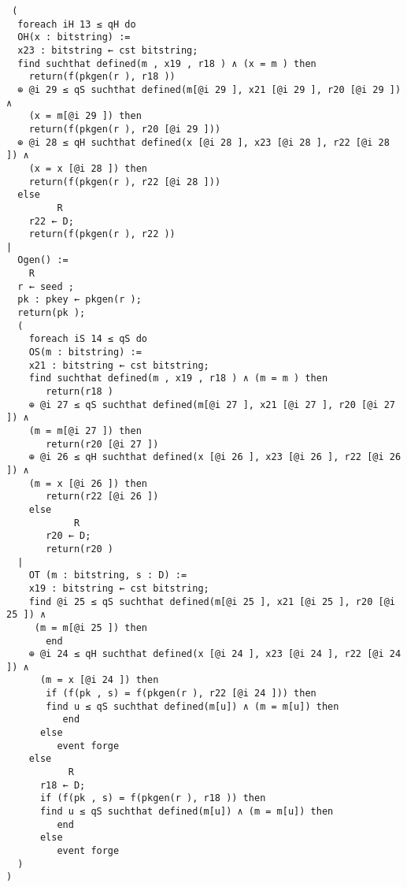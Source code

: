 \documentclass[a4paper,openright,twoside,12pt]{report}
\begin{document}
\begin{verbatim}
 (
  foreach iH 13 ≤ qH do
  OH(x : bitstring) :=
  x23 : bitstring ← cst bitstring;
  find suchthat defined(m , x19 , r18 ) ∧ (x = m ) then
    return(f(pkgen(r ), r18 ))
  ⊕ @i 29 ≤ qS suchthat defined(m[@i 29 ], x21 [@i 29 ], r20 [@i 29 ]) ∧ 
    (x = m[@i 29 ]) then
	return(f(pkgen(r ), r20 [@i 29 ]))
  ⊕ @i 28 ≤ qH suchthat defined(x [@i 28 ], x23 [@i 28 ], r22 [@i 28 ]) ∧ 
    (x = x [@i 28 ]) then
    return(f(pkgen(r ), r22 [@i 28 ]))
  else
         R
    r22 ← D;
    return(f(pkgen(r ), r22 ))
|
  Ogen() :=
    R
  r ← seed ;
  pk : pkey ← pkgen(r );
  return(pk );
  (
    foreach iS 14 ≤ qS do
    OS(m : bitstring) :=
    x21 : bitstring ← cst bitstring;
    find suchthat defined(m , x19 , r18 ) ∧ (m = m ) then
       return(r18 )
    ⊕ @i 27 ≤ qS suchthat defined(m[@i 27 ], x21 [@i 27 ], r20 [@i 27 ]) ∧ 
    (m = m[@i 27 ]) then
       return(r20 [@i 27 ])
    ⊕ @i 26 ≤ qH suchthat defined(x [@i 26 ], x23 [@i 26 ], r22 [@i 26 ]) ∧ 
    (m = x [@i 26 ]) then
       return(r22 [@i 26 ])
    else
            R
       r20 ← D;
       return(r20 )
  |
    OT (m : bitstring, s : D) :=
    x19 : bitstring ← cst bitstring;
    find @i 25 ≤ qS suchthat defined(m[@i 25 ], x21 [@i 25 ], r20 [@i 25 ]) ∧ 
     (m = m[@i 25 ]) then
       end
    ⊕ @i 24 ≤ qH suchthat defined(x [@i 24 ], x23 [@i 24 ], r22 [@i 24 ]) ∧ 
      (m = x [@i 24 ]) then
       if (f(pk , s) = f(pkgen(r ), r22 [@i 24 ])) then
       find u ≤ qS suchthat defined(m[u]) ∧ (m = m[u]) then
          end
      else
         event forge
    else
           R
      r18 ← D;
      if (f(pk , s) = f(pkgen(r ), r18 )) then
      find u ≤ qS suchthat defined(m[u]) ∧ (m = m[u]) then
         end
      else
         event forge
  )
)

\end{verbatim}
\end{document}
